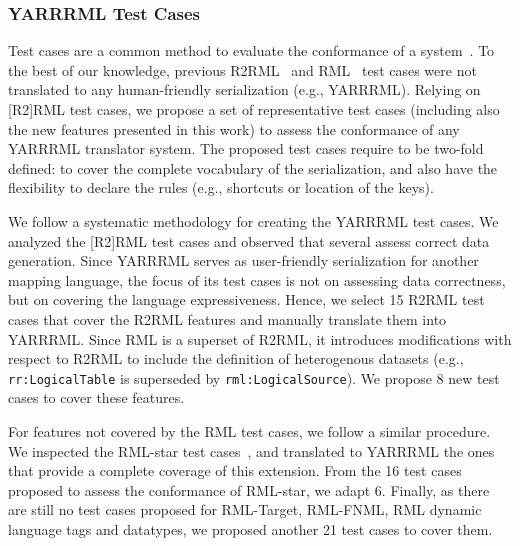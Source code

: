 \subsubsection{YARRRML Test Cases} %
Test cases are a common method to evaluate the conformance of a system~\parencite{arenas2023morphstar,heyvaert2019conformance}. 
To the best of our knowledge, previous R2RML~\parencite{boris2012r2rml} and RML~\parencite{heyvaert2019conformance} test cases were not translated to any human-friendly serialization (e.g., YARRRML).
Relying on [R2]RML test cases, we propose a set of representative test cases (including also the new features presented in this work) to assess the conformance of any YARRRML translator system.
The proposed test cases require to be two-fold defined: to cover the complete vocabulary of the serialization, and also have the flexibility to declare the rules (e.g., shortcuts or location of the keys). 

We follow a systematic methodology for creating the YARRRML test cases. 
We analyzed the [R2]RML test cases and observed that several assess correct data generation.
Since YARRRML serves as user-friendly serialization for another mapping language, the focus of its test cases is not on assessing data correctness, but on covering the language expressiveness.
Hence, we select 15 R2RML test cases that cover the R2RML features and manually translate them into YARRRML. 
Since RML is a superset of R2RML, it introduces modifications with respect to R2RML to include the definition of heterogenous datasets (e.g., \texttt{rr:LogicalTable} is superseded by \texttt{rml:LogicalSource}). %
We propose 8 new test cases to cover these features. 

For features not covered by the RML test cases, we follow a similar procedure. 
We inspected the RML-star test cases~\parencite{david_chaves_2022_6518802}, and translated to YARRRML the ones that provide a complete coverage of this extension. 
From the 16 test cases proposed to assess the conformance of RML-star, we adapt 6. 
Finally, as there are still no test cases proposed for RML-Target, RML-FNML, RML dynamic language tags and datatypes, we 
proposed another 21 test cases to cover them.

